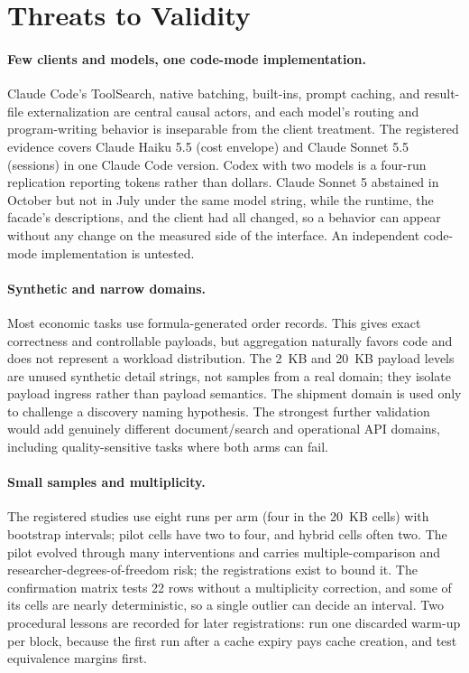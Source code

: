 \documentclass[10pt,twocolumn]{article}
\begin{document}
\section{Threats to Validity}
\label{sec:limitations}

\paragraph{Few clients and models, one code-mode implementation.}
Claude Code's ToolSearch, native batching, built-ins, prompt caching, and
result-file externalization are central causal actors, and each model's routing
and program-writing behavior is inseparable from the client treatment.  The
registered evidence covers Claude Haiku 5.5 (cost envelope) and Claude Sonnet
5.5 (sessions) in one Claude Code version.  Codex with two models is a
four-run replication reporting tokens rather than dollars.  Claude Sonnet 5
abstained in October but not in July under the same model string, while the
runtime, the facade's descriptions, and the client had all changed, so a
behavior can appear without any change on the measured side of the
interface.  An independent code-mode implementation is untested.

\paragraph{Synthetic and narrow domains.}
Most economic tasks use formula-generated order records.  This gives exact
correctness and controllable payloads, but aggregation naturally favors code
and does not represent a workload distribution.  The 2~KB and 20~KB payload
levels are unused synthetic detail strings, not samples from a real domain;
they isolate payload ingress rather than payload semantics.  The shipment
domain is used only to challenge a discovery naming hypothesis.  The
strongest further validation would add genuinely different document/search and
operational API domains, including quality-sensitive tasks where both arms can
fail.

\paragraph{Small samples and multiplicity.}  The registered studies use eight
runs per arm (four in the 20~KB cells) with bootstrap intervals; pilot cells
have two to four, and hybrid cells often two.  The pilot evolved through many
interventions and carries multiple-comparison and researcher-degrees-of-freedom
risk; the registrations exist to bound it.  The confirmation matrix tests 22
rows without a multiplicity correction, and some of its cells are nearly
deterministic, so a single outlier can decide an interval.  Two procedural
lessons are recorded for later registrations: run one discarded warm-up per
block, because the first run after a cache expiry pays cache creation, and
test equivalence margins first.
\end{document}
